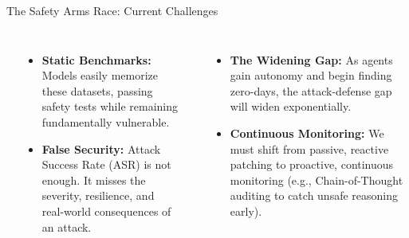 \begin{frame}{The Safety Arms Race: Current Challenges}
  \vspace*{0.2cm}
  \begin{columns}[T]
    {\small\bfseries{}}
    \begin{itemize}\small\setlength\itemsep{4pt}
      \item \textbf{Static Benchmarks:} Models easily memorize these datasets, passing safety tests while remaining fundamentally vulnerable.
      \item \textbf{False Security:} Attack Success Rate (ASR) is not enough. It misses the severity, resilience, and real-world consequences of an attack.
    \end{itemize}

    {\small\bfseries{}}
    \begin{itemize}\small\setlength\itemsep{4pt}
      \item \textbf{The Widening Gap:} As agents gain autonomy and begin finding zero-days, the attack-defense gap will widen exponentially.
      \item \textbf{Continuous Monitoring:} We must shift from passive, reactive patching to proactive, continuous monitoring (e.g., Chain-of-Thought auditing to catch unsafe reasoning early).
    \end{itemize}
  \end{columns}
\end{frame}


